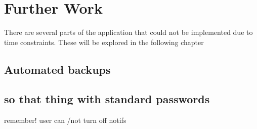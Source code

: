\chapter{Further Work}
There are several parts of the application that could not be implemented due to time constraints.
These will be explored in the following chapter

\section{Automated backups}
\section{so that thing with standard passwords}\label{RememberToEditThisInUseCasesToo}
remember! user can /not turn off notifs 